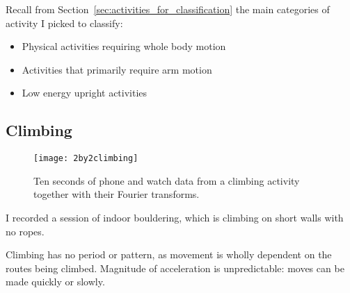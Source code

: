     Recall from Section~\ref{sec:activities_for_classification} the main categories of activity I picked to classify:
    \begin{itemize}
      \item Physical activities requiring whole body motion
      \item Activities that primarily require arm motion
      \item Low energy upright activities
    \end{itemize}
    \pagebreak[4]
    \subsection{Climbing}
      \begin{figure}[!th]
        \centering
        \texttt{[image: 2by2climbing]}
        \caption[Climbing sample]{Ten seconds of phone and watch data from a climbing activity together with their Fourier transforms.}
        \label{fig:2by2climbing }
      \end{figure}
      
      I recorded a session of indoor bouldering, which is climbing on short walls with no ropes.
      
      Climbing has no period or pattern, as movement is wholly dependent on the routes being climbed. Magnitude of acceleration is unpredictable: moves can be made quickly or slowly.
    \pagebreak[4]
